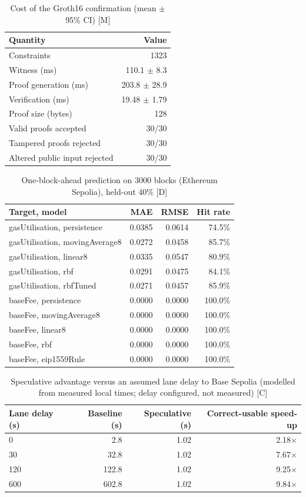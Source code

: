 \begin{table}[t]
\centering
\caption{Cost of the Groth16 confirmation (mean $\pm$ 95\% CI) [M]}
\label{tab:zk}
\begin{tabular}{lr}
\toprule
Quantity & Value \\
\midrule
Constraints & 1323 \\
Witness (ms) & 110.1 $\pm$ 8.3 \\
Proof generation (ms) & 203.8 $\pm$ 28.9 \\
Verification (ms) & 19.48 $\pm$ 1.79 \\
Proof size (bytes) & 128 \\
Valid proofs accepted & 30/30 \\
Tampered proofs rejected & 30/30 \\
Altered public input rejected & 30/30 \\
\bottomrule
\end{tabular}
\end{table}

\begin{table}[t]
\centering
\caption{One-block-ahead prediction on 3000 blocks (Ethereum Sepolia), held-out 40\% [D]}
\label{tab:rbf}
\begin{tabular}{lrrr}
\toprule
Target, model & MAE & RMSE & Hit rate \\
\midrule
gasUtilisation, persistence & 0.0385 & 0.0614 & 74.5\% \\
gasUtilisation, movingAverage8 & 0.0272 & 0.0458 & 85.7\% \\
gasUtilisation, linear8 & 0.0335 & 0.0547 & 80.9\% \\
gasUtilisation, rbf & 0.0291 & 0.0475 & 84.1\% \\
gasUtilisation, rbfTuned & 0.0271 & 0.0457 & 85.9\% \\
baseFee, persistence & 0.0000 & 0.0000 & 100.0\% \\
baseFee, movingAverage8 & 0.0000 & 0.0000 & 100.0\% \\
baseFee, linear8 & 0.0000 & 0.0000 & 100.0\% \\
baseFee, rbf & 0.0000 & 0.0000 & 100.0\% \\
baseFee, eip1559Rule & 0.0000 & 0.0000 & 100.0\% \\
\bottomrule
\end{tabular}
\end{table}

\begin{table}[t]
\centering
\caption{Speculative advantage versus an assumed lane delay to Base Sepolia (modelled from measured local times; delay configured, not measured) [C]}
\label{tab:xchain}
\begin{tabular}{lrrr}
\toprule
Lane delay (s) & Baseline (s) & Speculative (s) & Correct-usable speed-up \\
\midrule
0 & 2.8 & 1.02 & 2.18$\times$ \\
30 & 32.8 & 1.02 & 7.67$\times$ \\
120 & 122.8 & 1.02 & 9.25$\times$ \\
600 & 602.8 & 1.02 & 9.84$\times$ \\
\bottomrule
\end{tabular}
\end{table}

